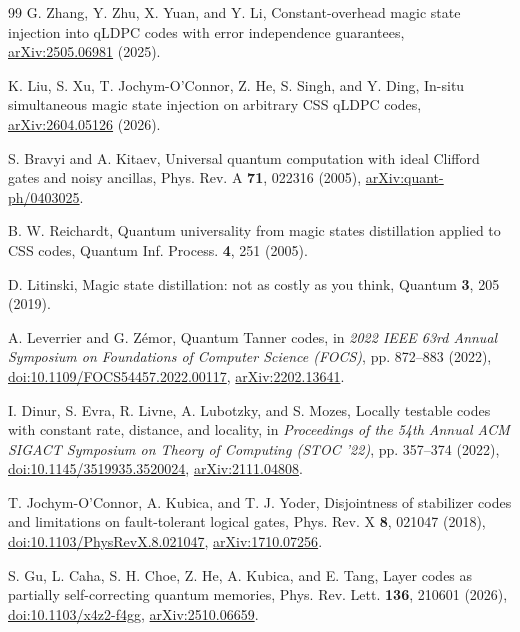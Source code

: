 \begin{thebibliography}{99}
G. Zhang, Y. Zhu, X. Yuan, and Y. Li, Constant-overhead magic state injection into qLDPC codes with error independence guarantees, \href{https://arxiv.org/abs/2505.06981}{arXiv:2505.06981} (2025).

K. Liu, S. Xu, T. Jochym-O'Connor, Z. He, S. Singh, and Y. Ding, In-situ simultaneous magic state injection on arbitrary CSS qLDPC codes, \href{https://arxiv.org/abs/2604.05126}{arXiv:2604.05126} (2026).

S. Bravyi and A. Kitaev, Universal quantum computation with ideal Clifford gates and noisy ancillas, Phys. Rev. A \textbf{71}, 022316 (2005), \href{https://arxiv.org/abs/quant-ph/0403025}{arXiv:quant-ph/0403025}.

B. W. Reichardt, Quantum universality from magic states distillation applied to CSS codes, Quantum Inf. Process. \textbf{4}, 251 (2005).

D. Litinski, Magic state distillation: not as costly as you think, Quantum \textbf{3}, 205 (2019).

A. Leverrier and G. Z\'emor, Quantum Tanner codes, in \emph{2022 IEEE 63rd Annual Symposium on Foundations of Computer Science (FOCS)}, pp. 872--883 (2022), \href{https://doi.org/10.1109/FOCS54457.2022.00117}{doi:10.1109/FOCS54457.2022.00117}, \href{https://arxiv.org/abs/2202.13641}{arXiv:2202.13641}.

I. Dinur, S. Evra, R. Livne, A. Lubotzky, and S. Mozes, Locally testable codes with constant rate, distance, and locality, in \emph{Proceedings of the 54th Annual ACM SIGACT Symposium on Theory of Computing (STOC '22)}, pp. 357--374 (2022), \href{https://doi.org/10.1145/3519935.3520024}{doi:10.1145/3519935.3520024}, \href{https://arxiv.org/abs/2111.04808}{arXiv:2111.04808}.

T. Jochym-O'Connor, A. Kubica, and T. J. Yoder, Disjointness of stabilizer codes and limitations on fault-tolerant logical gates, Phys. Rev. X \textbf{8}, 021047 (2018), \href{https://doi.org/10.1103/PhysRevX.8.021047}{doi:10.1103/PhysRevX.8.021047}, \href{https://arxiv.org/abs/1710.07256}{arXiv:1710.07256}.

S. Gu, L. Caha, S. H. Choe, Z. He, A. Kubica, and E. Tang, Layer codes as partially self-correcting quantum memories, Phys. Rev. Lett. \textbf{136}, 210601 (2026), \href{https://doi.org/10.1103/x4z2-f4gg}{doi:10.1103/x4z2-f4gg}, \href{https://arxiv.org/abs/2510.06659}{arXiv:2510.06659}.
\end{thebibliography}
